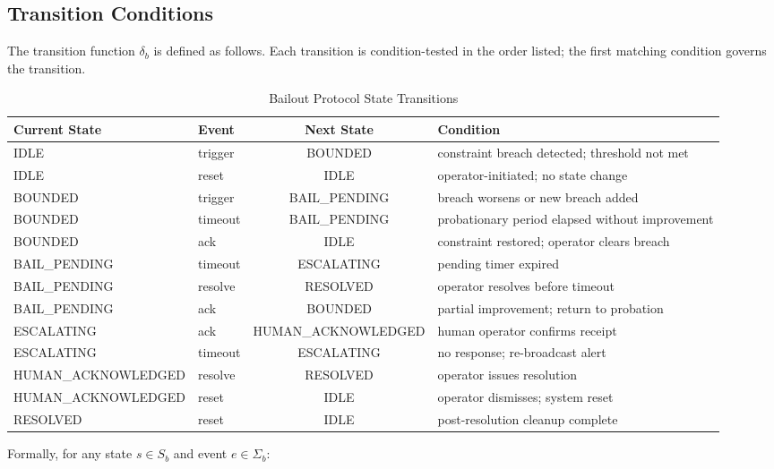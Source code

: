 \subsection{Transition Conditions}

The transition function $\delta_b$ is defined as follows. Each transition is condition-tested in the order listed; the first matching condition governs the transition.

\begin{table}[htbp]
\centering
\caption{Bailout Protocol State Transitions}
\label{tab:bailout_transitions}
\begin{tabular}{@{}llcl@{}}
\toprule
\textbf{Current State} & \textbf{Event} & \textbf{Next State} & \textbf{Condition} \\
\midrule
IDLE & trigger & BOUNDED & constraint breach detected; threshold not met \\
IDLE & reset & IDLE & operator-initiated; no state change \\
BOUNDED & trigger & BAIL\_PENDING & breach worsens or new breach added \\
BOUNDED & timeout & BAIL\_PENDING & probationary period elapsed without improvement \\
BOUNDED & ack & IDLE & constraint restored; operator clears breach \\
BAIL\_PENDING & timeout & ESCALATING & pending timer expired \\
BAIL\_PENDING & resolve & RESOLVED & operator resolves before timeout \\
BAIL\_PENDING & ack & BOUNDED & partial improvement; return to probation \\
ESCALATING & ack & HUMAN\_ACKNOWLEDGED & human operator confirms receipt \\
ESCALATING & timeout & ESCALATING & no response; re-broadcast alert \\
HUMAN\_ACKNOWLEDGED & resolve & RESOLVED & operator issues resolution \\
HUMAN\_ACKNOWLEDGED & reset & IDLE & operator dismisses; system reset \\
RESOLVED & reset & IDLE & post-resolution cleanup complete \\
\bottomrule
\end{tabular}
\end{table}

Formally, for any state $s \in S_b$ and event $e \in \Sigma_b$:

